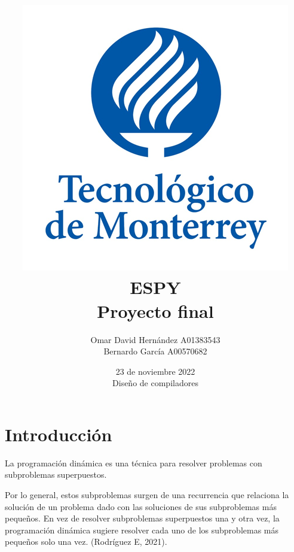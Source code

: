\documentclass[12pt,letterpaper, titlepage, onecolumn]{article}
\begin{document}
\begin{titlepage}
    \title{\vspace{-5.0cm}\includegraphics{img/logoTec}\\
    {\Huge ESPY} \\
	Proyecto final}    
    
    \author{Omar David Hernández     A01383543
    \\
    Bernardo García     A00570682}
    
    \date {23 de noviembre 2022 \\ Diseño de compiladores}
\end{titlepage}

 
\maketitle

\tableofcontents
\newpage
\justify

\section{Introducción}		
La programación dinámica es una técnica para resolver problemas con subproblemas 
superpuestos.\\
\par\indent Por lo general, estos subproblemas surgen de una recurrencia que relaciona la 
solución de un problema dado con las soluciones de sus subproblemas más pequeños.
En vez de resolver subproblemas superpuestos una y otra vez, la programación 
dinámica sugiere resolver cada uno de los subproblemas más pequeños solo una vez. (Rodríguez E, 2021).
	
\end{document}
